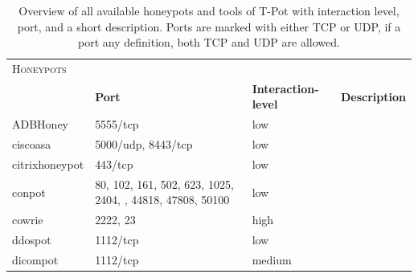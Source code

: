 \begin{table}
    \centering
    \caption[Overview honeypots of T-Pot]{Overview of all available honeypots and tools of T-Pot with interaction level, port, and a short description. Ports are marked with either TCP or UDP, if a port any definition, both TCP and UDP are allowed.}
    \begin{tabularx}{\linewidth}{l|XlX}
        \toprule
        \textsc{Honeypots}                       & \multicolumn{3}{c}{}                                                                                                                                            \\
                                                 & \textbf{Port}                                                                                               & \textbf{Interaction-level} & \textbf{Description} \\
        \hline
        ADBHoney \cite{adbhoney2021}             & 5555/tcp                                                                                                    & low                                                  \\
        ciscoasa \cite{cymmetria2018}            & 5000/udp, 8443/tcp                                                                                          & low                                                  \\
        citrixhoneypot \cite{citrixhoneypot2020} & 443/tcp                                                                                                     & low                                                  \\
        conpot \cite{conpot2021}                 & 80, 102, 161, 502, 623, 1025, 2404, \newline 10001, 44818, 47808, 50100                                     & low                                                  \\
        cowrie \cite{cowire2021}                 & 2222, 23                                                                                                    & high                                                  \\
        ddospot \cite{ddosspot2021}              & 1112/tcp                                                                                                    & low                                                  \\
        dicompot \cite{dicompot2021}             & 1112/tcp                                                                                                    & medium                                                  \\

\end{tabularx}
\end{table}
